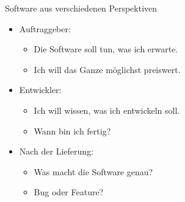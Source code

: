 \begin{frame}{Software aus verschiedenen Perspektiven}

\begin{itemize}

	
	\item Auftraggeber:

	\begin{itemize}
		\item \glqq Die Software soll tun, was ich erwarte.\grqq
		\item \glqq Ich will das Ganze möglichst preiswert.\grqq
	\end{itemize}
	
	
	\item Entwickler:
	
	\begin{itemize}
		\item \glqq Ich will wissen, was ich entwickeln soll.\grqq
		\item \glqq Wann bin ich fertig?\grqq
	\end{itemize}
	
	
	\item Nach der Lieferung:
	
	\begin{itemize}
		\item \glqq Was macht die Software genau?\grqq
		\item \glqq Bug oder Feature?\grqq
	\end{itemize}
\end{itemize}

\end{frame}


